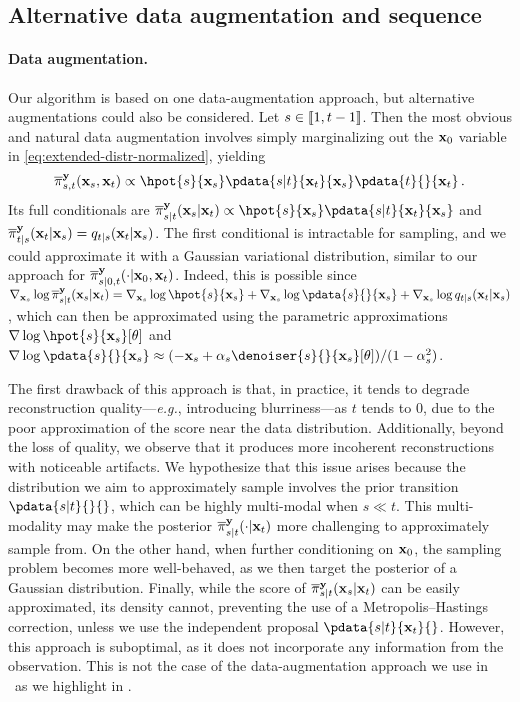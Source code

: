 \subsection{Alternative data augmentation and sequence}
\label{apdx-sec:data-aug}
\paragraph{Data augmentation.} Our algorithm is based on one data-augmentation approach, but alternative augmentations could also be considered. 
Let $s \in \llbracket 1, t-1 \rrbracket$. Then the most obvious and natural data augmentation involves simply marginalizing out the $\mathbf{x}_0$ variable in \eqref{eq:extended-distr-normalized}, yielding 
$$ 
    \epost{s, t}{}{\bx_s, \bx_t} \propto \hpot{s}{\bx_s} \pdata{s|t}{\bx_t}{\bx_s} \pdata{t}{}{\bx_t} \eqsp.
$$ 
Its full conditionals are $\epost{s|t}{\bx_t}{\bx_s} \propto \hpot{s}{\bx_s} \pdata{s|t}{\bx_t}{\bx_s}$ and $\epost{t|s}{\bx_s}{\bx_t} = \fw{t|s}{\bx_s}{\bx_t}$. The first conditional is intractable for sampling, and we could approximate it with a Gaussian variational distribution, similar to our approach for $\epost{s|0, t}{\bx_0, \bx_t}{}$. Indeed, this is possible since $\nabla_{\bx_s} \log \epost{s|t}{\bx_t}{\bx_s} = \nabla_{\bx_s} \log \hpot{s}{\bx_s} + \nabla_{\bx_s} \log \pdata{s}{}{\bx_s} + \nabla_{\bx_s} \log \fw{t|s}{\bx_s}{\bx_t}$, which can then be approximated using the parametric approximations $\nabla \log \hpot{s}{\bx_s}[\param]$ and $\nabla \log \pdata{s}{}{\bx_s} \approx (- \bx_s + \a_s \denoiser{s}{}{\bx_s}[\param]) / (1 - \a^2 _s)$. 

The first drawback of this approach is that, in practice, it tends to degrade reconstruction quality---\emph{e.g.}, introducing blurriness---as $t$ tends to $0$, due to the poor approximation of the score near the data distribution. Additionally, beyond the loss of quality, we observe that it produces more incoherent reconstructions with noticeable artifacts. We hypothesize that this issue arises because the distribution we aim to approximately sample involves the prior transition $\pdata{s|t}{}{}$,  which can be highly multi-modal when $s \ll t$. This multi-modality may make the posterior $\epost{s|t}{\bx_t}{}$ more challenging to approximately sample from. On the other hand, when further conditioning on $\mathbf{x}_0$, the sampling problem becomes more well-behaved, as we then target the posterior of a Gaussian distribution. Finally, while the score of $\epost{\smash{s|t}}{\bx_t}{\bx_s}$ can be easily approximated, its density cannot, preventing the use of a Metropolis--Hastings correction, unless we use the independent proposal $\pdata{s|t}{\bx_t}{}$. However, this approach is suboptimal, as it does not incorporate any information from the observation. This is not the case of the data-augmentation approach we use in \algo\ as we highlight in . 
